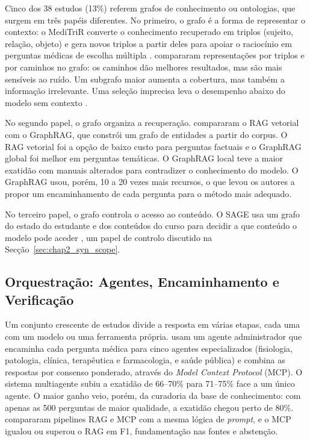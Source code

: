 Cinco dos 38 estudos (13\%) referem grafos de conhecimento ou ontologias, que surgem em três papéis diferentes. No primeiro, o grafo é a forma de representar o contexto: o MediTriR converte o conhecimento recuperado em triplos (sujeito, relação, objeto) e gera novos triplos a partir deles para apoiar o raciocínio em perguntas médicas de escolha múltipla \parencite{zhang2025meditrir}. \textcite{ghanbari2025evaluating} compararam representações por triplos e por caminhos no grafo: os caminhos dão melhores resultados, mas são mais sensíveis ao ruído. Um subgrafo maior aumenta a cobertura, mas também a informação irrelevante. Uma seleção imprecisa leva o desempenho abaixo do modelo sem contexto \parencite{ghanbari2025evaluating,ghanbari2025quantifying}.

No segundo papel, o grafo organiza a recuperação. \textcite{jain2025aligning} compararam o \gls{RAG} vetorial com o GraphRAG, que constrói um grafo de entidades a partir do corpus. O \gls{RAG} vetorial foi a opção de baixo custo para perguntas factuais e o GraphRAG global foi melhor em perguntas temáticas. O GraphRAG local teve a maior exatidão com manuais alterados para contradizer o conhecimento do modelo. O GraphRAG usou, porém, 10 a 20 vezes mais recursos, o que levou os autores a propor um encaminhamento de cada pergunta para o método mais adequado.

No terceiro papel, o grafo controla o acesso ao conteúdo. O SAGE usa um grafo do estado do estudante e dos conteúdos do curso para decidir a que conteúdo o modelo pode aceder \parencite{rayhan2026sage}, um papel de controlo discutido na Secção~\ref{sec:chap2_syn_scope}.

\subsection{Orquestração: Agentes, Encaminhamento e Verificação}
\label{sec:chap2_agents}

Um conjunto crescente de estudos divide a resposta em várias etapas, cada uma com um modelo ou uma ferramenta própria. \textcite{liu2026quality} usam um agente administrador que encaminha cada pergunta médica para cinco agentes especializados (fisiologia, patologia, clínica, terapêutica e farmacologia, e saúde pública) e combina as respostas por consenso ponderado, através do \emph{Model Context Protocol} (MCP). O sistema multiagente subiu a exatidão de 66--70\% para 71--75\% face a um único agente. O maior ganho veio, porém, da curadoria da base de conhecimento: com apenas as 500 perguntas de maior qualidade, a exatidão chegou perto de 80\%. \textcite{ishadya2026mitigating} compararam pipelines \gls{RAG} e MCP com a mesma lógica de \emph{prompt}, e o MCP igualou ou superou o \gls{RAG} em F1, fundamentação nas fontes e abstenção.

